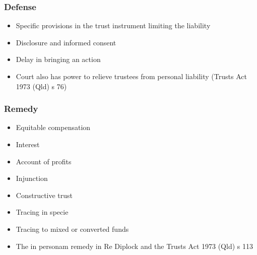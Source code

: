 \subsubsection*{Defense}
\begin{itemize}
    \item Specific provisions in the trust instrument limiting the liability
    \item Disclosure and informed consent
        \item Delay in bringing an action
    \item  Court also has power to relieve trustees from personal liability (Trusts Act 1973 (Qld) s 76)

\end{itemize}

\subsubsection*{Remedy}
\begin{itemize}
    \item Equitable compensation
    \item Interest
    \item Account of profits
    \item Injunction
    \item Constructive trust
    \item Tracing in specie
    \item Tracing to mixed or converted funds
    \item The in personam remedy in Re Diplock and the Trusts Act 1973 (Qld) s 113
\end{itemize}




